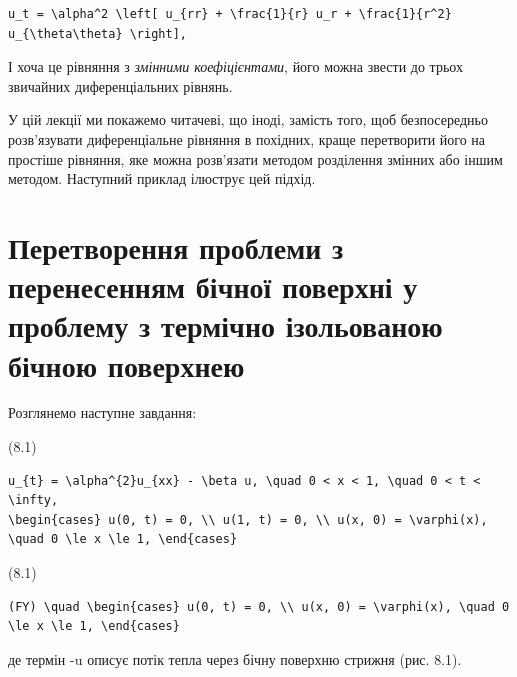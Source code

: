 \documentclass[
  ukrainian,
]{article}
\begin{document}
\begin{verbatim}
u_t = \alpha^2 \left[ u_{rr} + \frac{1}{r} u_r + \frac{1}{r^2} u_{\theta\theta} \right],
\end{verbatim}

І хоча це рівняння з \emph{змінними коефіцієнтами}, його можна звести до
трьох звичайних диференціальних рівнянь.

У цій лекції ми покажемо читачеві, що іноді, замість того, щоб
безпосередньо розв'язувати диференціальне рівняння в похідних, краще
перетворити його на простіше рівняння, яке можна розв'язати методом
розділення змінних або іншим методом. Наступний приклад ілюструє цей
підхід.

\section{Перетворення проблеми з перенесенням бічної поверхні у проблему
з термічно ізольованою бічною
поверхнею}\label{ux43fux435ux440ux435ux442ux432ux43eux440ux435ux43dux43dux44f-ux43fux440ux43eux431ux43bux435ux43cux438-ux437-ux43fux435ux440ux435ux43dux435ux441ux435ux43dux43dux44fux43c-ux431ux456ux447ux43dux43eux457-ux43fux43eux432ux435ux440ux445ux43dux456-ux443-ux43fux440ux43eux431ux43bux435ux43cux443-ux437-ux442ux435ux440ux43cux456ux447ux43dux43e-ux456ux437ux43eux43bux44cux43eux432ux430ux43dux43eux44e-ux431ux456ux447ux43dux43eux44e-ux43fux43eux432ux435ux440ux445ux43dux435ux44e}

Розглянемо наступне завдання:

(8.1)

\begin{verbatim}
u_{t} = \alpha^{2}u_{xx} - \beta u, \quad 0 < x < 1, \quad 0 < t < \infty,
\begin{cases} u(0, t) = 0, \\ u(1, t) = 0, \\ u(x, 0) = \varphi(x), \quad 0 \le x \le 1, \end{cases}
\end{verbatim}

(8.1)

\begin{verbatim}
(FY) \quad \begin{cases} u(0, t) = 0, \\ u(x, 0) = \varphi(x), \quad 0 \le x \le 1, \end{cases}
\end{verbatim}

де термін -\beta u описує потік тепла через бічну поверхню стрижня (рис.
8.1).
\end{document}
